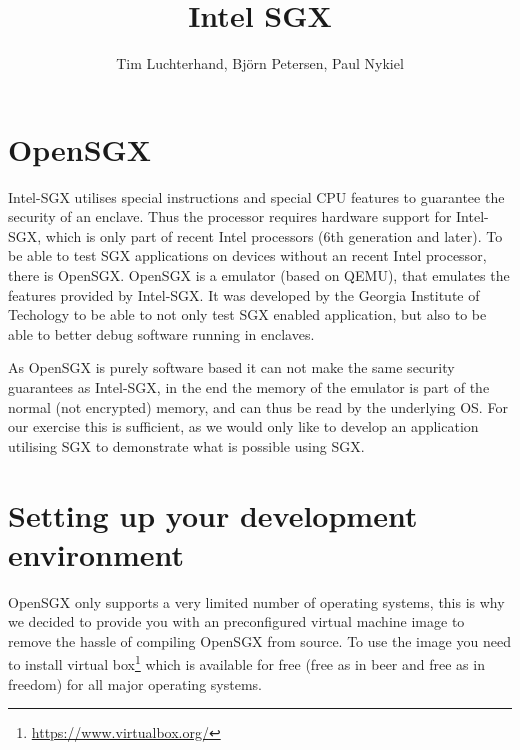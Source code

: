 \documentclass[DIN, pagenumber=false, fontsize=11pt, parskip=half]{scrartcl}
\title{Intel SGX}
\author{Tim Luchterhand, Björn Petersen, Paul Nykiel}
\begin{document}
    \maketitle
    \section{OpenSGX}
    Intel-SGX utilises special instructions and special CPU features to guarantee the security of an enclave.
    Thus the processor requires hardware support for Intel-SGX, which is only part of recent Intel
    processors (6th generation and later). To be able to test SGX applications on devices without an recent
    Intel processor, there is OpenSGX. OpenSGX is a emulator (based on QEMU), that emulates the features
    provided by Intel-SGX. It was developed by the Georgia Institute of Techology to be able to not only
    test SGX enabled application, but also to be able to better debug software running in enclaves.

    As OpenSGX is purely software based it can not make the same security guarantees as Intel-SGX, in the end
    the memory of the emulator is part of the normal (not encrypted) memory, and can thus be read by the
    underlying OS.
    For our exercise this is sufficient, as we would only like to develop an application utilising SGX to demonstrate
    what is possible using SGX.

    \section{Setting up your development environment}
    OpenSGX only supports a very limited number of operating systems, this is why we decided to provide you with
    an preconfigured virtual machine image to remove the hassle of compiling OpenSGX from source. To use the image
    you need to install virtual box\footnote{\url{https://www.virtualbox.org/}}  which is available for free
    (free as in beer and free as in freedom) for all major operating systems. 
\end{document}
